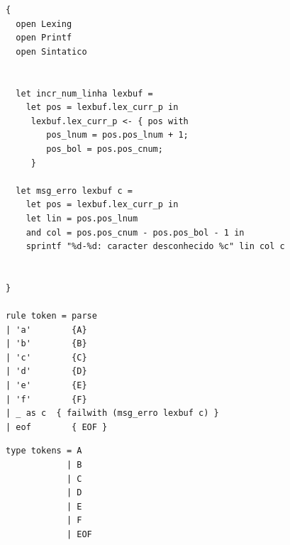 \documentclass[hidelinks,12pt]{article}
\begin{document}
	\begin{lstlisting}[caption=lexico.mll, style=OcamlStyle]
{
  open Lexing
  open Printf
  open Sintatico
         

  let incr_num_linha lexbuf = 
    let pos = lexbuf.lex_curr_p in
     lexbuf.lex_curr_p <- { pos with
        pos_lnum = pos.pos_lnum + 1;
        pos_bol = pos.pos_cnum;
     }

  let msg_erro lexbuf c =
    let pos = lexbuf.lex_curr_p in
    let lin = pos.pos_lnum
    and col = pos.pos_cnum - pos.pos_bol - 1 in
    sprintf "%d-%d: caracter desconhecido %c" lin col c


}

rule token = parse 
| 'a'        {A}
| 'b'        {B}
| 'c'        {C}
| 'd'        {D}
| 'e'        {E}
| 'f'        {F}
| _ as c  { failwith (msg_erro lexbuf c) }
| eof        { EOF }
	\end{lstlisting}
	
	\begin{lstlisting}[caption=sintatico.mli, style=OcamlStyle]
type tokens = A
            | B
            | C
            | D
            | E
            | F
            | EOF
	
	\end{lstlisting}
	
\end{document}
